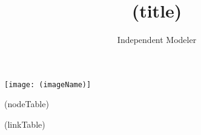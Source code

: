 \documentclass{article}
\title{(title)}
\author{Independent Modeler}
\begin{document}
\maketitle

\begin{center}
\texttt{[image: (imageName)]}
\end{center}\label{f-ac}

(nodeTable)

(linkTable)
\end{document}
